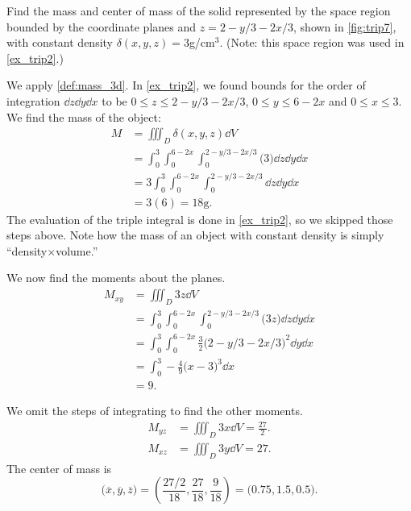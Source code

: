 \begin{example}\label{ex_trip7}%
Find the mass and center of mass of the solid represented by the space region bounded by the coordinate planes and $z=2-y/3-2x/3$, shown in \autoref{fig:trip7}, with constant density $\delta(x,y,z)=3$g/cm$^3$. (Note: this space region was used in \autoref{ex_trip2}.)

\solution
We apply \autoref{def:mass_3d}. In \autoref{ex_trip2}, we found bounds for the order of integration $\dd z\dd y\dd x$ to be $0\leq z\leq 2-y/3-2x/3$, $0\leq y\leq 6-2x$ and $0\leq x\leq 3$. We find the mass of the object: 
\begin{align*}
M &= \iiint_D \delta(x,y,z)\dd V \\
  &= \int_0^3\int_0^{6-2x}\int_0^{2-y/3-2x/3} \bigl(3\bigr)\dd z\dd y\dd x\\
	&= 3\int_0^3\int_0^{6-2x}\int_0^{2-y/3-2x/3} \dd z\dd y\dd x\\
	&= 3(6) = 18\text{g}.
\end{align*}
The evaluation of the triple integral is done in \autoref{ex_trip2}, so we skipped those steps above. Note how the mass of an object with constant density is simply ``density$\times$volume.''

We now find the moments about the planes.
\begin{align*}
M_{xy} &= \iiint_D 3z\dd V \\
			&= \int_0^3\int_0^{6-2x}\int_0^{2-y/3-2x/3} \bigl(3z\bigr)\dd z\dd y\dd x\\
			&= \int_0^3\int_0^{6-2x} \frac32\bigl(2-y/3-2x/3\bigr)^2\dd y\dd x \\
			&= \int_0^3 -\frac49\bigl(x-3\bigr)^3\dd x\\
			&= 9.
\end{align*}

We omit the steps of integrating to find the other moments.
\begin{align*}
M_{yz} &= \iiint_D 3x\dd V = \frac{27}2.\\
M_{xz} &= \iiint_D 3y\dd V = 27.
\end{align*}
The center of mass is
\[\bigl(\overline{x},\overline{y},\overline{z}\bigr) = \left(\frac{27/2}{18},\frac{27}{18},\frac{9}{18}\right) = \bigl(0.75,1.5,0.5\bigr).\]
\end{example}


